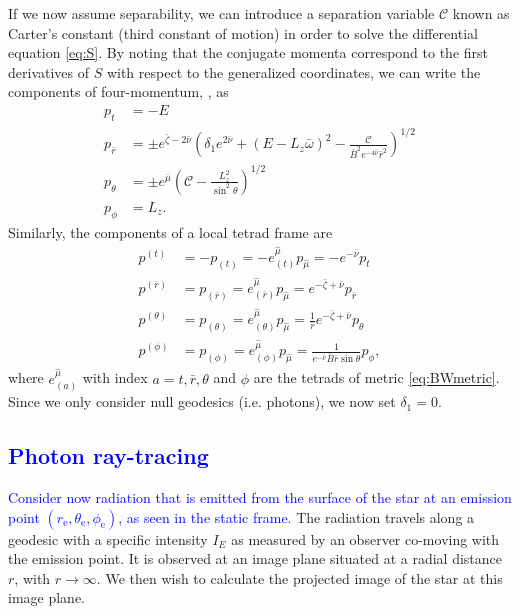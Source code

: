 \documentclass{aa}
\makeatletter
\def\fvec#1{\underline{\sbox\tw@{$#1$}\dp\tw@\z@\box\tw@}}
\newcommand{\refe}[1]{\textcolor{blue}{{#1}}}
\newcommand{\Ca}{\ensuremath{\mathcal{C}}}
\newcommand{\rb}{\ensuremath{\bar{r}}}
\newcommand{\wb}{\ensuremath{\bar{\omega}}}
\newcommand{\nub}{\ensuremath{\bar{\nu}}}
\newcommand{\zetab}{\ensuremath{\bar{\zeta}}}
\newcommand{\Bb}{\ensuremath{\bar{B}}}
\newcommand{\mub}{\ensuremath{\bar{\mu}}}
\makeatother
\begin{document}
If we now assume separability, we can introduce a separation variable $\Ca$ known as Carter's constant (third constant of motion) in order to solve the differential equation \eqref{eq:S}.  
By noting that the conjugate momenta correspond to the first derivatives of $S$ with respect to the generalized coordinates, we can write the components of four-momentum, \fvec{p}, as 
\begin{align}
  p_t        &= -E \label{eq:p_t}\\
  p_{\rb}    &= \pm e^{\zetab - 2\nub} \left( \delta_1 e^{2\nub} + (E - L_z \wb)^2 - \frac{\Ca}{\Bb^2 e^{-4\nub} \rb^2} \right)^{1/2}\label{eq:p_r}\\
  p_{\theta} &= \pm e^{\mub} \left( \Ca - \frac{L_z^2}{\sin^2\theta} \right)^{1/2}\label{eq:p_the}\\
  p_{\phi}   &= L_z\label{eq:p_p}.
\end{align}
Similarly, the components of a local tetrad frame are
\begin{align}
  p^{(t)} &= -p_{(t)} = -e_{(t)}^{\hat{\mu}} p_{\hat{\mu}} = -e^{-\nub}p_t \label{eq:tetp_t}\\
  p^{(\rb)} &= p_{(\rb)} = e_{(\rb)}^{\hat{\mu}} p_{\hat{\mu}} = e^{-\zetab + \nub} p_{\rb} \label{eq:tetp_r}\\
  p^{(\theta)} &= p_{(\theta)} = e_{(\theta)}^{\hat{\mu}} p_{\hat{\mu}} = \frac{1}{\rb} e^{-\zetab+\nub} p_{\theta} \label{eq:tetp_theta}\\
  p^{(\phi)} &= p_{(\phi)} = e_{(\phi)}^{\hat{\mu}} p_{\hat{\mu}} = \frac{1}{e^{-\nub} \Bb \rb \sin\theta} p_{\phi} \label{eq:tetp_phi},
\end{align}
where $e^{\hat{\mu}}_{(a)}$ with index $a = t, \rb, \theta$ and $\phi$ are the tetrads of metric \eqref{eq:BWmetric}.
Since we only consider null geodesics (i.e. photons), we now set $\delta_1 = 0$.

\subsection{\refe{Photon ray-tracing} }\label{sect:raytracing}
\refe{Consider now radiation that is emitted from the surface of the star at an emission point $(r_{\mathrm{e}},\theta_{\mathrm{e}},\phi_{\mathrm{e}})$, as seen in the static frame.}
The radiation travels along a geodesic with a specific intensity $I_{E}$ as measured by an observer co-moving with the emission point.  
It is observed at an image plane situated at a radial distance $r$, with $r\rightarrow\infty$.  
We then wish to calculate the projected image of the star at this image plane.
\end{document}
